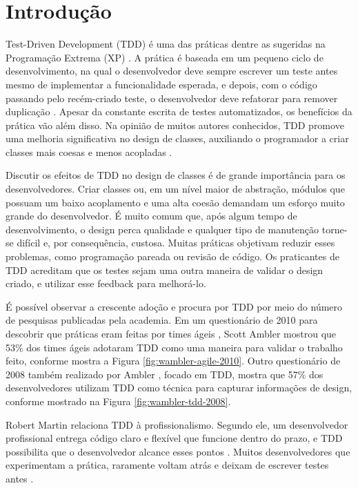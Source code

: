 \chapter{Introdução}
\label{cap:introducao}

Test-Driven Development (TDD) é uma das práticas dentre as sugeridas na Programação
Extrema (XP) \cite{XPExplained}. A prática é baseada em um pequeno ciclo de
desenvolvimento, na qual o desenvolvedor deve sempre escrever um teste antes
mesmo de implementar a funcionalidade esperada, e depois, com o código
passando pelo recém-criado teste, o desenvolvedor deve refatorar para 
remover duplicação \cite{TDDByExample}.
Apesar da constante escrita de testes automatizados, os benefícios da
prática vão além disso. Na opinião de muitos autores conhecidos, TDD promove
uma melhoria significativa no design de classes, auxiliando o programador a
criar classes mais coesas e menos acopladas \cite{TDDByExample} \cite{GOOS} 
\cite{astels-tdd}.

Discutir os efeitos de TDD no design de classes é de grande importância para os
desenvolvedores.
Criar classes ou, em um nível maior de abstração, módulos que possuam um baixo
acoplamento e uma alta coesão demandam um esforço muito grande do desenvolvedor. 
É muito comum que, após algum tempo de desenvolvimento, o design perca qualidade
e qualquer tipo de manutenção torne-se difícil e, por consequência, custosa.
Muitas práticas objetivam reduzir esses problemas, como programação pareada ou
revisão de código. Os praticantes de TDD acreditam que os testes sejam uma outra
maneira de validar o design criado, e utilizar esse feedback para melhorá-lo.

É possível observar a crescente adoção e procura por TDD
por meio do número de pesquisas publicadas pela academia.
Em um questionário de 2010 para descobrir que práticas eram feitas por times
ágeis \cite{wambler-survey-agile}, Scott Ambler mostrou que 53\% dos times ágeis
adotaram TDD como uma maneira para validar o trabalho feito, conforme mostra a 
Figura \ref{fig:wambler-agile-2010}. Outro questionário de 2008 também realizado por Ambler
\cite{wambler-survey-tdd}, focado em TDD, mostra que 57\% dos desenvolvedores 
utilizam TDD como técnica para capturar informações de design, conforme mostrado
na Figura \ref{fig:wambler-tdd-2008}.

Robert Martin relaciona TDD à profissionalismo. Segundo ele, um desenvolvedor
profissional entrega código claro e flexível que funcione dentro do prazo, e TDD
possibilita que o desenvolvedor alcance esses pontos \cite{martin-profissionalismo}.
Muitos desenvolvedores que experimentam a prática, raramente voltam atrás e deixam
de escrever testes antes \cite{tdd-fearless}. 

